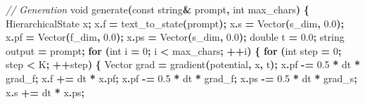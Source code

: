\documentclass[
  11pt,
  a4paper,
]{article}
\newenvironment{Shaded}{\begin{snugshade}}{\end{snugshade}}
\newcommand{\AttributeTok}[1]{\textcolor[rgb]{0.13,0.29,0.53}{#1}}
\newcommand{\CommentTok}[1]{\textcolor[rgb]{0.56,0.35,0.01}{\textit{#1}}}
\newcommand{\ControlFlowTok}[1]{\textcolor[rgb]{0.13,0.29,0.53}{\textbf{#1}}}
\newcommand{\DataTypeTok}[1]{\textcolor[rgb]{0.13,0.29,0.53}{#1}}
\newcommand{\DecValTok}[1]{\textcolor[rgb]{0.00,0.00,0.81}{#1}}
\newcommand{\FloatTok}[1]{\textcolor[rgb]{0.00,0.00,0.81}{#1}}
\newcommand{\NormalTok}[1]{#1}
\newcommand{\OperatorTok}[1]{\textcolor[rgb]{0.81,0.36,0.00}{\textbf{#1}}}
\newcommand{\VariableTok}[1]{\textcolor[rgb]{0.00,0.00,0.00}{#1}}
\begin{document}
\begin{Shaded}
\begin{Highlighting}[]
\CommentTok{// Generation}
\DataTypeTok{void}\NormalTok{ generate}\OperatorTok{(}\AttributeTok{const}\NormalTok{ string}\OperatorTok{\&}\NormalTok{ prompt}\OperatorTok{,} \DataTypeTok{int}\NormalTok{ max\_chars}\OperatorTok{)} \OperatorTok{\{}
\NormalTok{    HierarchicalState x}\OperatorTok{;}
\NormalTok{    x}\OperatorTok{.}\NormalTok{f }\OperatorTok{=}\NormalTok{ text\_to\_state}\OperatorTok{(}\NormalTok{prompt}\OperatorTok{);}
\NormalTok{    x}\OperatorTok{.}\NormalTok{s }\OperatorTok{=}\NormalTok{ Vector}\OperatorTok{(}\VariableTok{s\_dim}\OperatorTok{,} \FloatTok{0.0}\OperatorTok{);}
\NormalTok{    x}\OperatorTok{.}\NormalTok{pf }\OperatorTok{=}\NormalTok{ Vector}\OperatorTok{(}\NormalTok{f\_dim}\OperatorTok{,} \FloatTok{0.0}\OperatorTok{);}
\NormalTok{    x}\OperatorTok{.}\NormalTok{ps }\OperatorTok{=}\NormalTok{ Vector}\OperatorTok{(}\VariableTok{s\_dim}\OperatorTok{,} \FloatTok{0.0}\OperatorTok{);}
    \DataTypeTok{double}\NormalTok{ t }\OperatorTok{=} \FloatTok{0.0}\OperatorTok{;}
\NormalTok{    string output }\OperatorTok{=}\NormalTok{ prompt}\OperatorTok{;}
    \ControlFlowTok{for} \OperatorTok{(}\DataTypeTok{int}\NormalTok{ i }\OperatorTok{=} \DecValTok{0}\OperatorTok{;}\NormalTok{ i }\OperatorTok{\textless{}}\NormalTok{ max\_chars}\OperatorTok{;} \OperatorTok{++}\NormalTok{i}\OperatorTok{)} \OperatorTok{\{}
        \ControlFlowTok{for} \OperatorTok{(}\DataTypeTok{int}\NormalTok{ step }\OperatorTok{=} \DecValTok{0}\OperatorTok{;}\NormalTok{ step }\OperatorTok{\textless{}}\NormalTok{ K}\OperatorTok{;} \OperatorTok{++}\NormalTok{step}\OperatorTok{)} \OperatorTok{\{}
\NormalTok{            Vector grad }\OperatorTok{=}\NormalTok{ gradient}\OperatorTok{(}\NormalTok{potential}\OperatorTok{,}\NormalTok{ x}\OperatorTok{,}\NormalTok{ t}\OperatorTok{);}
\NormalTok{            x}\OperatorTok{.}\NormalTok{pf }\OperatorTok{{-}=} \FloatTok{0.5} \OperatorTok{*}\NormalTok{ dt }\OperatorTok{*}\NormalTok{ grad\_f}\OperatorTok{;}
\NormalTok{            x}\OperatorTok{.}\NormalTok{f }\OperatorTok{+=}\NormalTok{ dt }\OperatorTok{*}\NormalTok{ x}\OperatorTok{.}\NormalTok{pf}\OperatorTok{;}
\NormalTok{            x}\OperatorTok{.}\NormalTok{pf }\OperatorTok{{-}=} \FloatTok{0.5} \OperatorTok{*}\NormalTok{ dt }\OperatorTok{*}\NormalTok{ grad\_f}\OperatorTok{;}
\NormalTok{            x}\OperatorTok{.}\NormalTok{ps }\OperatorTok{{-}=} \FloatTok{0.5} \OperatorTok{*}\NormalTok{ dt }\OperatorTok{*}\NormalTok{ grad\_s}\OperatorTok{;}
\NormalTok{            x}\OperatorTok{.}\NormalTok{s }\OperatorTok{+=}\NormalTok{ dt }\OperatorTok{*}\NormalTok{ x}\OperatorTok{.}\NormalTok{ps}\OperatorTok{;}

\end{Highlighting}
\end{Shaded}
\end{document}
